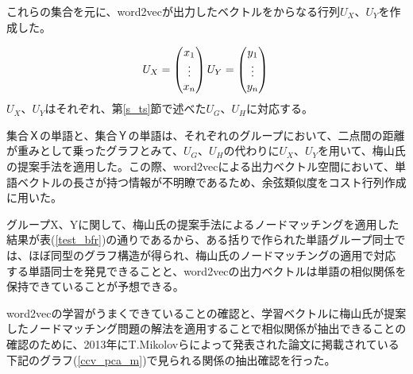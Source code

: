 これらの集合を元に、word2vecが出力したベクトルをからなる行列$U_X$、$U_Y$を作成した。

\begin{equation}
  U_X=\begin{pmatrix}
    x_1 \\
    \vdots \\
    x_n
  \end{pmatrix} \notag \\
  \\
  U_Y=\begin{pmatrix}
    y_1 \\
    \vdots \\
    y_n
  \end{pmatrix} \notag \\
\end{equation}
$U_X$、$U_Y$はそれぞれ、第\ref{s_ts}節で述べた$U_G$、$U_H$に対応する。

集合Ｘの単語と、集合Ｙの単語は、それぞれのグループにおいて、二点間の距離が重みとして乗ったグラフとみて、$U_G$、$U_H$の代わりに$U_X$、$U_Y$を用いて、梅山氏の提案手法を適用した。この際、word2vecによる出力ベクトル空間において、単語ベクトルの長さが持つ情報が不明瞭であるため、余弦類似度をコスト行列作成に用いた。

グループX、Yに関して、梅山氏の提案手法によるノードマッチングを適用した結果が表(\ref{test_bfr})の通りであるから、ある括りで作られた単語グループ同士では、ほぼ同型のグラフ構造が得られ、梅山氏のノードマッチングの適用で対応する単語同士を発見できることと、word2vecの出力ベクトルは単語の相似関係を保持できていることが予想できる。

word2vecの学習がうまくできていることの確認と、学習ベクトルに梅山氏が提案したノードマッチング問題の解法を適用することで相似関係が抽出できることの確認のために、2013年にT.Mikolovらによって発表された論文に掲載されている下記のグラフ(\ref{ccv_pca_m})で見られる関係の抽出確認を行った。

